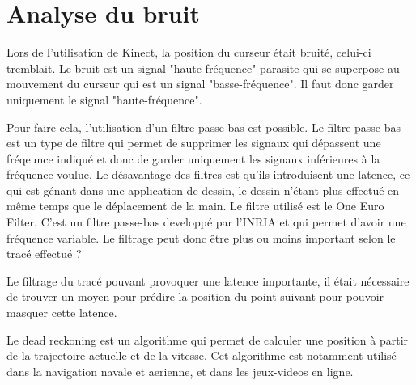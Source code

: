 \chapter{Analyse du bruit}

Lors de l'utilisation de Kinect, la position du curseur était bruité, celui-ci tremblait. Le bruit est un signal "haute-fréquence" parasite qui se superpose au mouvement du curseur qui est un signal "basse-fréquence". Il faut donc garder uniquement le signal "haute-fréquence".

Pour faire cela, l'utilisation d'un filtre passe-bas est possible. Le filtre passe-bas est un type de filtre qui permet de supprimer les signaux qui dépassent une fréqeunce indiqué et donc de garder uniquement les signaux inférieures à la fréquence voulue. Le désavantage des filtres est qu'ils introduisent une latence, ce qui est génant dans une application de dessin, le dessin n'étant plus effectué en même temps que le déplacement de la main. Le filtre utilisé est le One Euro Filter. C'est un filtre passe-bas developpé par l'INRIA et qui permet d'avoir une fréquence variable. Le filtrage peut donc être plus ou moins important selon le tracé effectué ?

Le filtrage du tracé pouvant provoquer une latence importante, il était nécessaire de trouver un moyen pour prédire la position du point suivant pour pouvoir masquer cette latence.

Le dead reckoning est un algorithme qui permet de calculer une position à partir de la trajectoire actuelle et de la vitesse. Cet algorithme est notamment utilisé dans la navigation navale et aerienne, et dans les jeux-videos en ligne. 


